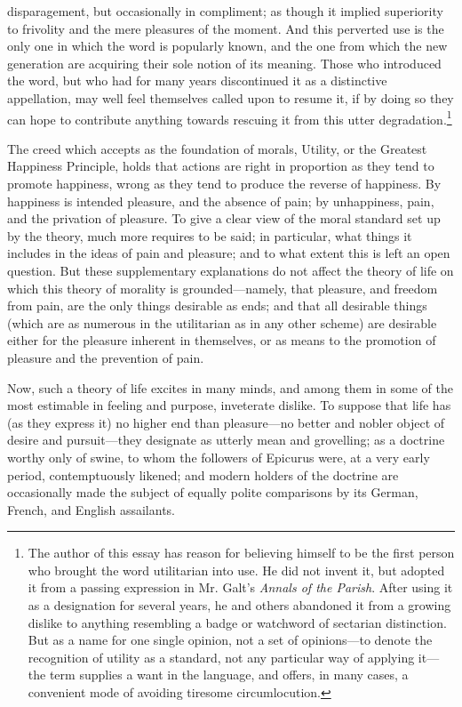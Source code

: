 disparagement, but occasionally in compliment; as though it implied
superiority to frivolity and the mere pleasures of the moment. And
this perverted use is the only one in which the word is popularly
known, and the one from which the new generation are acquiring their
sole notion of its meaning. Those who introduced the word, but who had
for many years discontinued it as a distinctive appellation, may well
feel themselves called upon to resume it, if by doing so they can hope
to contribute anything towards rescuing it from this utter
degradation.\footnote{The author of this essay has reason for
believing himself to be the first person who brought the word
utilitarian into use. He did not invent it, but adopted it from a
passing expression in Mr. Galt's \textit{Annals of the Parish}. After
using it as a designation for several years, he and others abandoned
it from a growing dislike to anything resembling a badge or watchword
of sectarian distinction. But as a name for one single opinion, not a
set of o\-pin\-ions---to denote the recognition of utility as a
standard, not any particular way of applying it---the term supplies a
want in the language, and offers, in many cases, a convenient mode of
avoiding tiresome circumlocution.}

The creed which accepts as the foundation of morals, Utility, or the
Greatest Happiness Principle, holds that actions are right in
proportion as they tend to promote happiness, wrong as they tend to
produce the  reverse of happiness. By happiness is intended
pleasure, and the absence of pain; by unhappiness, pain, and the
privation of pleasure. To give a clear view of the moral standard set
up by the theory, much more requires to be said; in particular, what
things it includes in the ideas of pain and pleasure; and to what
extent this is left an open question. But these supplementary
explanations do not affect the theory of life on which this theory of
morality is ground\-ed---name\-ly, that pleasure, and freedom from
pain, are the only things desirable as ends; and that all desirable
things (which are as numerous in the utilitarian as in any other
scheme) are desirable either for the pleasure inherent in themselves,
or as means to the promotion of pleasure and the prevention of pain.

Now, such a theory of life excites in many minds, and among them in
some of the most estimable in feeling and purpose, inveterate dislike.
To suppose that life has (as they express it) no higher end than
pleas\-ure---no better and nobler object of desire and
pur\-suit---they designate as utterly mean and grovelling; as a
doctrine worthy only of swine, to whom the followers of Epicurus were,
at a very early period, contemptuously likened; and modern holders of
the doctrine are occasionally made the subject of equally polite
comparisons by its German, French, and English assailants.

